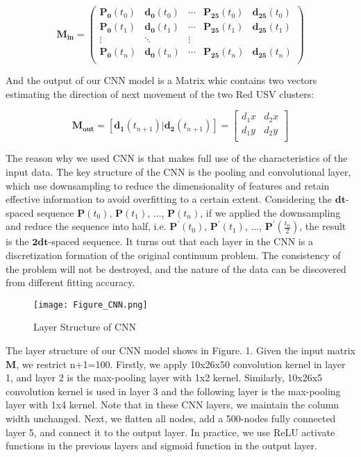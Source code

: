 \documentclass{mcmthesis}
\begin{document}
\begin{equation}
\mathbf{M_{in}} = 
  \begin{pmatrix}
  \mathbf{P_{0}}(t_0) & \mathbf{d_{0}}(t_0) & \cdots & \mathbf{P_{25}}(t_0) & \mathbf{d_{25}}(t_0)\\
  \mathbf{P_{0}}(t_1) & \mathbf{d_{0}}(t_1) & \cdots & \mathbf{P_{25}}(t_1) & \mathbf{d_{25}}(t_1) \\
  \vdots & \ddots & \vdots \\  
  \mathbf{P_{0}}(t_n) & \mathbf{d_{0}}(t_n) & \cdots & \mathbf{P_{25}}(t_n) & \mathbf{d_{25}}(t_n)  \\
  \end{pmatrix}
\end{equation}

And the output of our CNN model is a Matrix whic contains two vectors estimating the direction of next movement of the two Red USV clusters:

\begin{equation}
\mathbf{M_{out}} = [\mathbf{d_{1}}(t_{n+1}) \vert \mathbf{d_{2}}(t_{n+1})] = 
  \begin{bmatrix}
  d_1x & d_2x\\
  d_1y & d_2y  \\
  \end{bmatrix}
\end{equation}

The reason why we used CNN is that makes full use of the characteristics of the input data. The key structure of the CNN is the pooling and convolutional layer, which use downsampling to reduce the dimensionality of features and retain effective information to avoid overfitting to a certain extent. Considering the $\mathbf{dt}$-spaced sequence $\mathbf{P}(t_0)$, $\mathbf{P}(t_1)$, ..., $\mathbf{P}(t_n)$, if we applied the downsampling and reduce the sequence into half, i.e. $\mathbf{P}^{'}(t_0)$, $\mathbf{P}^{'}(t_1)$, ..., $\mathbf{P}^{'}(\frac{t_n}{2})$, the result is the $\mathbf{2dt}$-spaced sequence. It turns out that each layer in the CNN is a discretization formation of the original continuum problem. The consistency of the problem will not be destroyed, and the nature of the data can be discovered from different fitting accuracy.

\begin{figure}[h]
\small
\centering
\texttt{[image: Figure\_CNN.png]}
\caption{Layer Structure of CNN} \label{fig:Layer Structure of CNN}
\end{figure}

The layer structure of our CNN model shows in Figure. 1. Given the input matrix $\mathbf{M}$, we restrict n+1=100. Firstly, we apply 10x26x50 convolution kernel in layer 1, and layer 2 is the max-pooling layer with 1x2 kernel. Similarly, 10x26x5 convolution kernel is used in layer 3 and the following layer is the max-pooling layer with 1x4 kernel. Note that in these CNN layers, we maintain the column width unchanged. Next, we flatten all nodes, add a 500-nodes fully connected layer 5, and connect it to the output layer. In practice, we use ReLU activate functions in the previous layers and sigmoid function in the output layer. \par
\end{document}
